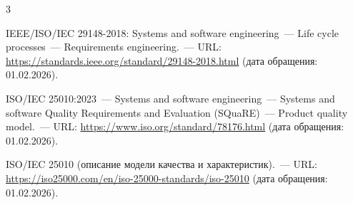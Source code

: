 
\begin{thebibliography}{3}

IEEE/ISO/IEC 29148-2018: Systems and software engineering~--- Life cycle processes~--- Requirements engineering.~--- URL: \url{https://standards.ieee.org/standard/29148-2018.html} (дата обращения: 01.02.2026).

ISO/IEC 25010:2023~--- Systems and software engineering~--- Systems and software Quality Requirements and Evaluation (SQuaRE)~--- Product quality model.~--- URL: \url{https://www.iso.org/standard/78176.html} (дата обращения: 01.02.2026).

ISO/IEC 25010 (описание модели качества и характеристик).~--- URL: \url{https://iso25000.com/en/iso-25000-standards/iso-25010} (дата обращения: 01.02.2026).

\end{thebibliography}
